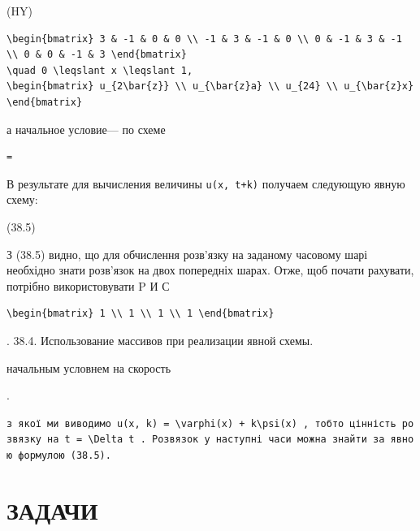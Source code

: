 \documentclass[
  ukrainian,
]{article}
\begin{document}
(HY)

\begin{verbatim}
\begin{bmatrix} 3 & -1 & 0 & 0 \\ -1 & 3 & -1 & 0 \\ 0 & -1 & 3 & -1 \\ 0 & 0 & -1 & 3 \end{bmatrix}
\quad 0 \leqslant x \leqslant 1,
\begin{bmatrix} u_{2\bar{z}} \\ u_{\bar{z}a} \\ u_{24} \\ u_{\bar{z}x} \end{bmatrix}
\end{verbatim}

а начальное условие--- по схеме

\begin{verbatim}
=
\end{verbatim}

В результате для вычисления величины \texttt{u(x,\ t+k)} получаем
следующую явную схему:

(38.5)

З (38.5) видно, що для обчислення розв'язку на заданому часовому шарі
необхідно знати розв'язок на двох попередніх шарах. Отже, щоб почати
рахувати, потрібно використовувати P И С

\begin{verbatim}
\begin{bmatrix} 1 \\ 1 \\ 1 \\ 1 \end{bmatrix}
\end{verbatim}

. 38.4. Использование массивов при реализации явной схемы.

начальным условнем на скорость

.

\texttt{з\ якої\ ми\ виводимо\ \textquotesingle{}u(x,\ k)\ =\ \textbackslash{}varphi(x)\ +\ k\textbackslash{}psi(x)\textquotesingle{}\ ,\ тобто\ цінність\ розв\textquotesingle{}язку\ на\ \textquotesingle{}t\ =\ \textbackslash{}Delta\ t\textquotesingle{}\ .\ Розв\textquotesingle{}язок\ у\ наступні\ часи\ можна\ знайти\ за\ явною\ формулою\ (38.5).}

\section{ЗАДАЧИ}\label{ux437ux430ux434ux430ux447ux438-6}
\end{document}
